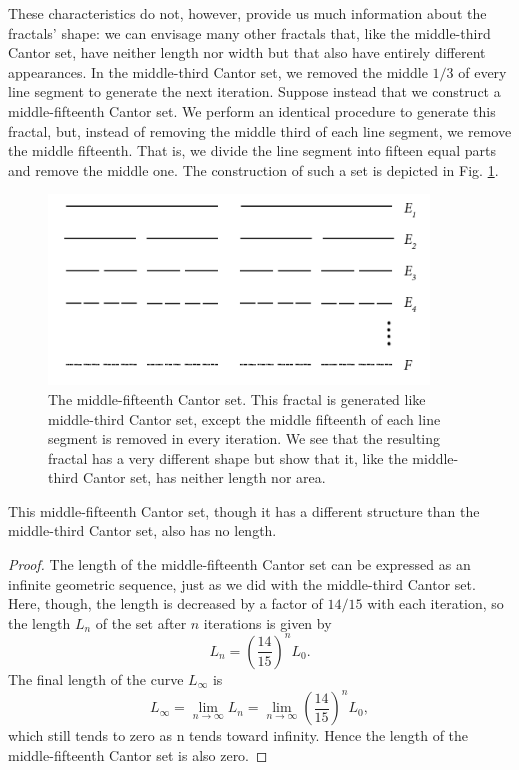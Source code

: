 These characteristics do not, however, provide us much information about the fractals' shape: we can envisage many other fractals that, like the middle-third Cantor set, have neither length nor width but that also have entirely different appearances. In the middle-third Cantor set, we removed the middle $1/3$ of every line segment to generate the next iteration. Suppose instead that we construct a middle-fifteenth Cantor set. We perform an identical procedure to generate this fractal, but, instead of removing the middle third of each line segment, we remove the middle fifteenth. That is, we divide the line segment into fifteen equal parts and remove the middle one. The construction of such a set is depicted in Fig. \ref{fig:middle15}. 

\begin{figure}[h]
\centering
\includegraphics[width=0.9\textwidth]{Chapters/Figures/middle15.png} 
\caption[Middle-fifteenth Cantor set]{The middle-fifteenth Cantor set. This fractal is generated like middle-third Cantor set, except the middle fifteenth of each line segment is removed in every iteration. We see that the resulting fractal has a very different shape but show that it, like the middle-third Cantor set, has neither length nor area.}\label{fig:middle15}
\end{figure}

\begin{myobs}This middle-fifteenth Cantor set, though it has a different structure than the middle-third Cantor set, also has no length.\end{myobs}

\begin{proof}The length of the middle-fifteenth Cantor set can be expressed as an infinite geometric sequence, just as we did with the middle-third Cantor set. Here, though, the length is decreased by a factor of $14/15$ with each iteration, so the length $L_n$ of the set after $n$ iterations is given by
\begin{equation}
	L_n = \left(\frac{14}{15}\right)^n L_0.
\end{equation}
The final length of the curve $L_\infty$ is 
\begin{equation}
	L_\infty = \lim_{n \to \infty}L_n = \lim_{n \to \infty}\left(\frac{14}{15}\right)^n L_0,
\end{equation}
which still tends to zero as n tends toward infinity. Hence the length of the middle-fifteenth Cantor set is also zero.
\end{proof}

